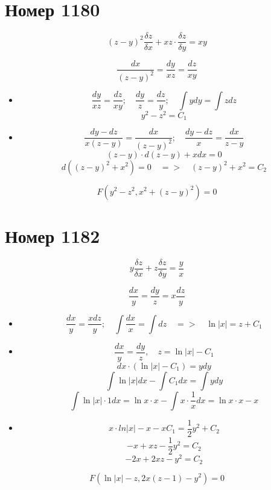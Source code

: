 \section*{Номер 1180}
$$ (z - y)^2 \dfrac{\delta z}{\delta x} + xz \cdot \dfrac{\delta z}{\delta y} = xy $$

\begin{solution}
    $$ \dfrac{dx}{(z - y)^2} = \dfrac{dy}{xz} = \dfrac{dz}{xy} $$
    \begin{itemize}
        \item
              $$ \dfrac{dy}{xz} = \dfrac{dz}{xy};\quad \dfrac{dy}{z} = \dfrac{dz}{y};\quad \int ydy = \int zdz $$
              $$ y^2 - z^2 = C_1 $$
        \item
              $$ \dfrac{dy - dz}{x(z - y)} = \dfrac{dx}{(z - y)^2};\quad \dfrac{dy - dz}{x} = \dfrac{dx}{z - y} $$
              $$ (z - y) \cdot d(z - y) + xdx = 0 $$
              $$ d((z - y)^2 + x^2) = 0\quad => \quad (z - y)^2 + x^2 = C_2 $$
    \end{itemize}
    $$ F(y^2 - z^2, x^2 + (z - y)^2) = 0 $$

\end{solution}

\section*{Номер 1182}
$$ y \dfrac{\delta z}{\delta x} + z \dfrac{\delta z}{\delta y} = \dfrac{y}{x} $$

\begin{solution}
    $$ \dfrac{dx}{y} = \dfrac{dy}{z} = x \dfrac{dz}{y} $$
    \begin{itemize}
        \item
              $$ \dfrac{dx}{y} = \dfrac{xdz}{y};\quad \int \dfrac{dx}{x} = \int dz \quad => \quad \ln |x| = z + C_1 $$
        \item
              $$ \dfrac{dx}{y} = \dfrac{dy}{z},\quad z = \ln |x| - C_1 $$
              $$ dx \cdot (\ln |x| - C_1) = ydy $$
              $$ \int \ln |x| dx - \int C_1 dx = \int ydy $$
              $$ \int \ln |x| \cdot 1 dx = \ln x \cdot x - \int x \cdot \dfrac{1}{x} dx = \ln x \cdot x - x $$
        \item
              $$ x \cdot ln|x| - x - x C_1 = \dfrac{1}{2} y^2 + C_2 $$
              $$ -x + xz - \dfrac{1}{2} y^2 = C_2 $$
              $$ -2x + 2xz - y^2 = C_2 $$
    \end{itemize}
    $$ F(\ln|x| - z, 2x(z - 1) - y^2) = 0 $$
\end{solution}\pagebreak